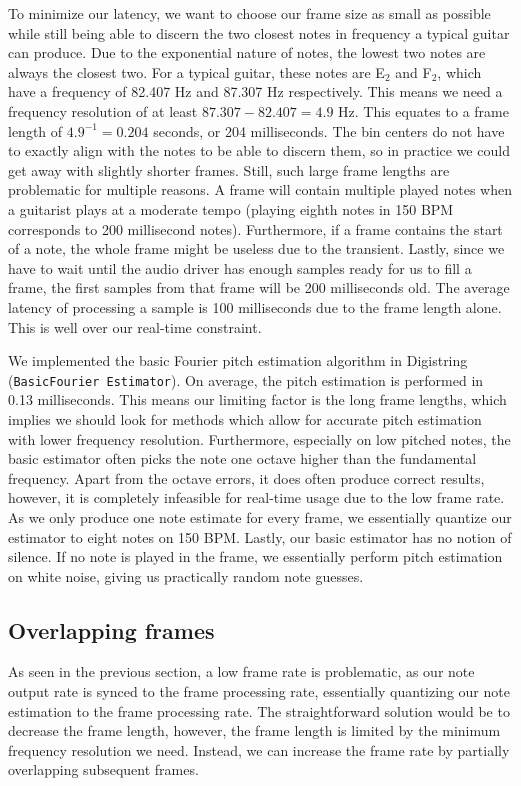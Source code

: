 \documentclass[a4paper,10pt,twocolumn]{article}
\newcommand{\note}[2]{#1${}_{#2}$}
\begin{document}
To minimize our latency, we want to choose our frame size as small as possible while still being able to discern the two closest notes in frequency a typical guitar can produce. Due to the exponential nature of notes, the lowest two notes are always the closest two. For a typical guitar, these notes are \note{E}{2} and \note{F}{2}, which have a frequency of 82.407 Hz and 87.307 Hz respectively. This means we need a frequency resolution of at least $87.307 - 82.407 = 4.9$ Hz. This equates to a frame length of $4.9^{-1} = 0.204$ seconds, or 204 milliseconds. The bin centers do not have to exactly align with the notes to be able to discern them, so in practice we could get away with slightly shorter frames. Still, such large frame lengths are problematic for multiple reasons. A frame will contain multiple played notes when a guitarist plays at a moderate tempo (playing eighth notes in 150 BPM corresponds to 200 millisecond notes). Furthermore, if a frame contains the start of a note, the whole frame might be useless due to the transient. Lastly, since we have to wait until the audio driver has enough samples ready for us to fill a frame, the first samples from that frame will be 200 milliseconds old. The average latency of processing a sample is 100 milliseconds due to the frame length alone. This is well over our real-time constraint.

We implemented the basic Fourier pitch estimation algorithm in Digistring (\texttt{BasicFourier Estimator}). On average, the pitch estimation is performed in 0.13 milliseconds. This means our limiting factor is the long frame lengths, which implies we should look for methods which allow for accurate pitch estimation with lower frequency resolution. Furthermore, especially on low pitched notes, the basic estimator often picks the note one octave higher than the fundamental frequency. Apart from the octave errors, it does often produce correct results, however, it is completely infeasible for real-time usage due to the low frame rate. As we only produce one note estimate for every frame, we essentially quantize our estimator to eight notes on 150 BPM. Lastly, our basic estimator has no notion of silence. If no note is played in the frame, we essentially perform pitch estimation on white noise, giving us practically random note guesses.


\subsection{Overlapping frames}  \label{sec:overlapping}
As seen in the previous section, a low frame rate is problematic, as our note output rate is synced to the frame processing rate, essentially quantizing our note estimation to the frame processing rate. The straightforward solution would be to decrease the frame length, however, the frame length is limited by the minimum frequency resolution we need. Instead, we can increase the frame rate by partially overlapping subsequent frames.
\end{document}
